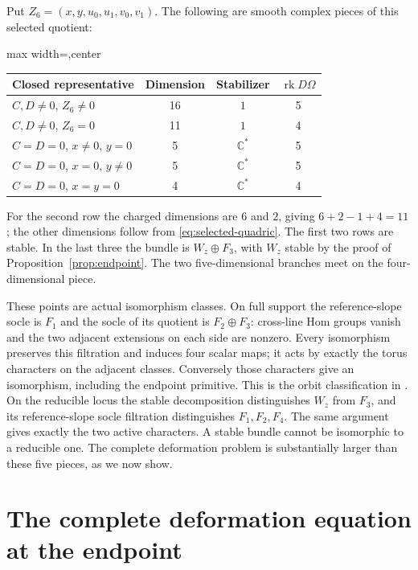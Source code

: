 \documentclass[11pt]{amsart}
\theoremstyle{definition}
\theoremstyle{remark}
\newcommand{\CC}{\mathbb C}
\newcommand{\rk}{\operatorname{rk}}
\begin{document}
Put $Z_6=(x,y,u_0,u_1,v_0,v_1)$. The following are smooth complex
pieces of this selected quotient:
\begin{center}
\begin{adjustbox}{max width=\textwidth,center}
\begin{tabular}{lccc}
\toprule
Closed representative & Dimension & Stabilizer & $\rk D\Omega$\\
\midrule
$C,D\ne0$, $Z_6\ne0$ &16&$1$&5\\
$C,D\ne0$, $Z_6=0$ &11&$1$&4\\
$C=D=0$, $x\ne0$, $y=0$ &5&$\CC^*$&5\\
$C=D=0$, $x=0$, $y\ne0$ &5&$\CC^*$&5\\
$C=D=0$, $x=y=0$ &4&$\CC^*$&4\\
\bottomrule
\end{tabular}
\end{adjustbox}
\end{center}
For the second row the charged dimensions are $6$ and $2$, giving
$6+2-1+4=11$; the other dimensions follow from
\eqref{eq:selected-quadric}. The first two rows are stable. In the last
three the bundle is $W_z\oplus F_3$, with $W_z$ stable by the proof
of Proposition~\ref{prop:endpoint}. The two five-dimensional branches
meet on the four-dimensional piece.

These points are actual isomorphism classes. On full support the
reference-slope socle is $F_1$ and the socle of its quotient is
$F_2\oplus F_3$: cross-line Hom groups vanish and the two adjacent
extensions on each side are nonzero. Every isomorphism preserves this
filtration and induces four scalar maps; it acts by exactly the torus
characters on the adjacent classes. Conversely those characters give an
isomorphism, including the endpoint primitive. This is the orbit
classification in \cite[Section~6]{wuebben2026three}. On the reducible
locus the stable decomposition distinguishes $W_z$ from $F_3$, and
its reference-slope socle filtration distinguishes $F_1,F_2,F_4$.
The same argument gives exactly the two active characters. A stable
bundle cannot be isomorphic to a reducible one.
The complete deformation problem is substantially larger than these five
pieces, as we now show.

\section{The complete deformation equation at the endpoint}\label{sec:endpoint-deformations}
\end{document}
